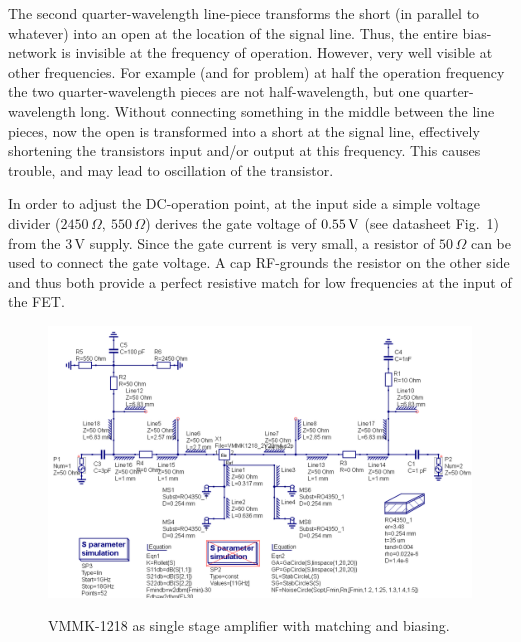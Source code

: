 The second quarter-wavelength line-piece transforms the short (in
parallel to whatever) into an open at the location of the signal
line. Thus, the entire bias-network is invisible at the frequency of
operation. However, very well visible at other frequencies. For
example (and for problem) at half the operation frequency the two
quarter-wavelength pieces are not half-wavelength, but one
quarter-wavelength long. Without connecting something in the middle
between the line pieces, now the open is transformed into a short at
the signal line, effectively shortening the transistors input and/or
output at this frequency. This causes trouble, and may lead to
oscillation of the transistor.

In order to adjust the DC-operation point, at the input side a simple
voltage divider ($2450\,\Omega,\ 550\,\Omega$) derives the gate
voltage of $0.55\,\mathrm{V}$ (see datasheet Fig.~1) from the 3\,V
supply. Since the gate current is very small, a resistor of
$50\,\Omega$ can be used to connect the gate voltage. A cap 
RF-grounds the resistor on the other side and thus both provide a perfect
resistive match for low frequencies at the input of the FET.

\begin{figure}
  \centering
  {\includegraphics[width=12cm]{vmmk1218_3.png}}
  \caption{VMMK-1218 as single stage amplifier with matching and
    biasing.}
  \label{fig:vmmk1218_3}
\end{figure}

